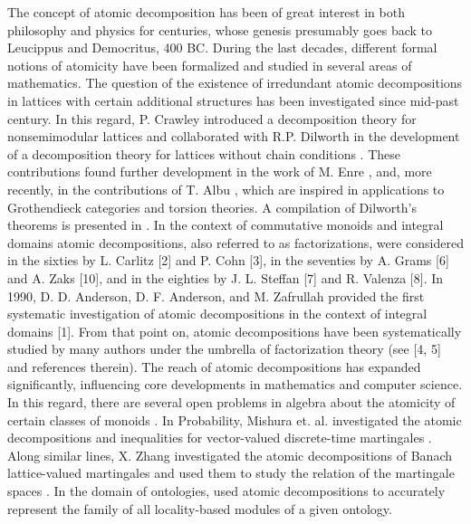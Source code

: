 \documentclass[12pt]{extarticle}
\begin{document}
	The concept of atomic decomposition has been of great interest in both philosophy and physics for centuries, whose genesis presumably goes back to Leucippus and Democritus, 400 BC. During the last decades, different formal notions of atomicity have been formalized and studied in several areas of mathematics. The question of the existence of irredundant atomic decompositions in lattices with certain additional structures has been investigated since mid-past century. In this regard, P. Crawley introduced a decomposition theory for nonsemimodular lattices \cite{PCrawley1} and collaborated with R.P. Dilworth in the development of a decomposition theory for lattices without chain conditions \cite{RPDilworth1}. These contributions found further development in the work of M. Enre \cite{MErne1}, and, more recently, in the contributions of T. Albu \cite{TAlbu1}, which are inspired in applications to Grothendieck categories and torsion theories. A compilation of Dilworth's theorems is presented in \cite{RPDilworth2}. In the context of commutative monoids and integral domains  atomic decompositions, also referred to as factorizations, were considered in the sixties by L. Carlitz [2] and P. Cohn [3], in the seventies by A. Grams [6] and A. Zaks [10], and in the eighties by J. L. Steffan [7] and R. Valenza [8]. In 1990, D. D. Anderson, D. F. Anderson, and M. Zafrullah provided the first systematic investigation of atomic decompositions in the context of integral domains [1]. From that point on, atomic decompositions have been systematically studied by many authors under the umbrella of factorization theory (see [4, 5] and references therein).
	The reach of atomic decompositions has expanded significantly, influencing core developments in mathematics and computer science. In this regard, there are several open problems in algebra about the atomicity of certain classes of monoids  \cite{Atomicity1,Atomicity2,Atomicity3}. In Probability, Mishura et. al. investigated the atomic decompositions and inequalities for vector-valued discrete-time martingales \cite{YSMishura}. Along similar lines, X. Zhang investigated the atomic decompositions of Banach lattice-valued martingales and used them to study the relation of the martingale spaces \cite{XZhang1}. In the domain of ontologies, \cite{ChVescovo1} \cite{MHorridge1} used atomic decompositions to accurately represent the family of all locality-based modules of a given ontology. 
	
\end{document}
